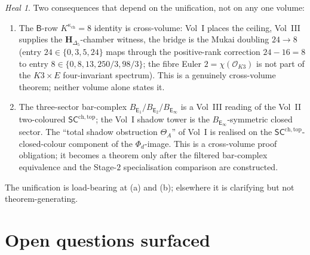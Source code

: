 \documentclass[11pt]{article}
\theoremstyle{definition}
\theoremstyle{remark}
\newtheorem{heal}[theorem]{Heal}
\providecommand{\cO}{\mathcal{O}}
\providecommand{\Eone}{\mathsf{E}_1}
\providecommand{\Etwo}{\mathsf{E}_2}
\providecommand{\Einf}{\mathsf{E}_\infty}
\providecommand{\kch}{\kappa_{\mathrm{ch}}}
\begin{document}
\begin{heal}
Two consequences that depend on the unification, not on any one volume:
\begin{enumerate}[label=(\alph*)]
\item The $\mathsf{B}$-row $K^{\kch} = 8$ identity is cross-volume: Vol~I
places the ceiling, Vol~III supplies the $\mathbf{H}_{\Delta_5}$-chamber
witness, the bridge is the Mukai doubling $24\to 8$ (entry
$24\in\{0,3,5,24\}$ maps through the positive-rank correction
$24-16=8$ to entry $8\in\{0,8,13,250/3,98/3\}$; the fibre Euler
$2=\chi(\cO_{K3})$ is not part of the $K3\times E$ four-invariant
spectrum). This is a genuinely cross-volume theorem; neither volume
alone states it.
\item The three-sector bar-complex $B_{\Eone}/B_{\Etwo}/B_{\Einf}$ is a
Vol~III reading of the Vol~II two-coloured
$\mathsf{SC}^{\mathrm{ch,top}}$; the Vol~I shadow tower is the
$B_{\Einf}$-symmetric closed sector. The ``total shadow obstruction
$\Theta_A$'' of Vol~I is realised on the
$\mathsf{SC}^{\mathrm{ch,top}}$-closed-colour component of the
$\Phi_d$-image. This is a cross-volume proof obligation; it becomes a
theorem only after the filtered bar-complex equivalence and the
Stage-$2$ specialisation comparison are constructed.
\end{enumerate}
The unification is load-bearing at (a) and (b); elsewhere it is
clarifying but not theorem-generating.
\end{heal}

\section{Open questions surfaced}
\end{document}
